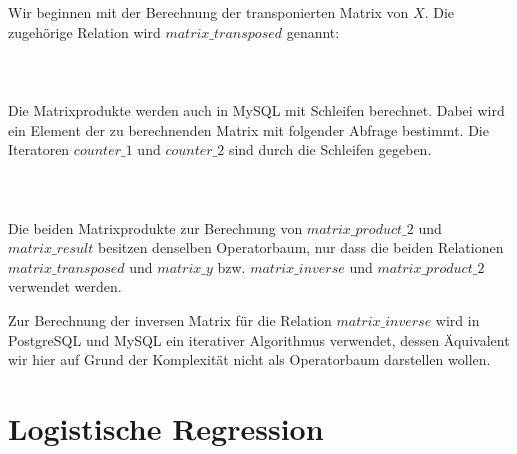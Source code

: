 Wir beginnen mit der Berechnung der transponierten Matrix von $X$. Die zugehörige Relation wird $matrix\_transposed$ genannt:
\\\\
\noindent{}
\\\\
Die Matrixprodukte werden auch in MySQL mit Schleifen berechnet. Dabei wird ein Element der zu berechnenden Matrix mit folgender Abfrage bestimmt. Die Iteratoren $counter\_1$ und $counter\_2$ sind durch die Schleifen gegeben.
\\\\
\noindent{}
\\\\
Die beiden Matrixprodukte zur Berechnung von $matrix\_product\_2$ und $matrix\_result$ besitzen denselben Operatorbaum, nur dass die beiden Relationen $matrix\_transposed$ und $matrix\_y$ bzw. $matrix\_inverse$ und $matrix\_product\_2$ verwendet werden.

Zur Berechnung der inversen Matrix für die Relation $matrix\_inverse$ wird in PostgreSQL und MySQL ein iterativer Algorithmus verwendet, dessen Äquivalent wir hier auf Grund der Komplexität nicht als Operatorbaum darstellen wollen.

\section{Logistische Regression}
\label{section:5:3}

